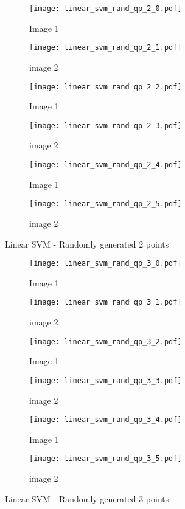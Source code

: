 \documentclass[10pt, a4paper,reqno]{amsart}
\begin{document}
\begin{figure}
	\centering	
	\begin{subfigure}{0.5\textwidth}
		\centering
		\texttt{[image: linear\_svm\_rand\_qp\_2\_0.pdf]}
		\caption{Image 1}
	\end{subfigure}%
	\begin{subfigure}{0.5\textwidth}
		\centering
		\texttt{[image: linear\_svm\_rand\_qp\_2\_1.pdf]}
		\caption{image 2}
	\end{subfigure}
	\begin{subfigure}{0.5\textwidth}
		\centering
		\texttt{[image: linear\_svm\_rand\_qp\_2\_2.pdf]}
		\caption{Image 1}
	\end{subfigure}%
	\begin{subfigure}{0.5\textwidth}
		\centering
		\texttt{[image: linear\_svm\_rand\_qp\_2\_3.pdf]}
		\caption{image 2}
	\end{subfigure}
	\begin{subfigure}{0.5\textwidth}
		\centering
		\texttt{[image: linear\_svm\_rand\_qp\_2\_4.pdf]}
		\caption{Image 1}
	\end{subfigure}%
	\begin{subfigure}{0.5\textwidth}
		\centering
		\texttt{[image: linear\_svm\_rand\_qp\_2\_5.pdf]}
		\caption{image 2}
	\end{subfigure}
	\caption{Linear SVM - Randomly generated 2 points}
\end{figure}

\begin{figure}
	\centering	
	\begin{subfigure}{0.5\textwidth}
		\centering
		\texttt{[image: linear\_svm\_rand\_qp\_3\_0.pdf]}
		\caption{Image 1}
	\end{subfigure}%
	\begin{subfigure}{0.5\textwidth}
		\centering
		\texttt{[image: linear\_svm\_rand\_qp\_3\_1.pdf]}
		\caption{image 2}
	\end{subfigure}
	\begin{subfigure}{0.5\textwidth}
		\centering
		\texttt{[image: linear\_svm\_rand\_qp\_3\_2.pdf]}
		\caption{Image 1}
	\end{subfigure}%
	\begin{subfigure}{0.5\textwidth}
		\centering
		\texttt{[image: linear\_svm\_rand\_qp\_3\_3.pdf]}
		\caption{image 2}
	\end{subfigure}
	\begin{subfigure}{0.5\textwidth}
		\centering
		\texttt{[image: linear\_svm\_rand\_qp\_3\_4.pdf]}
		\caption{Image 1}
	\end{subfigure}%
	\begin{subfigure}{0.5\textwidth}
		\centering
		\texttt{[image: linear\_svm\_rand\_qp\_3\_5.pdf]}
		\caption{image 2}
	\end{subfigure}
	\caption{Linear SVM - Randomly generated 3 points}
\end{figure}
\end{document}
